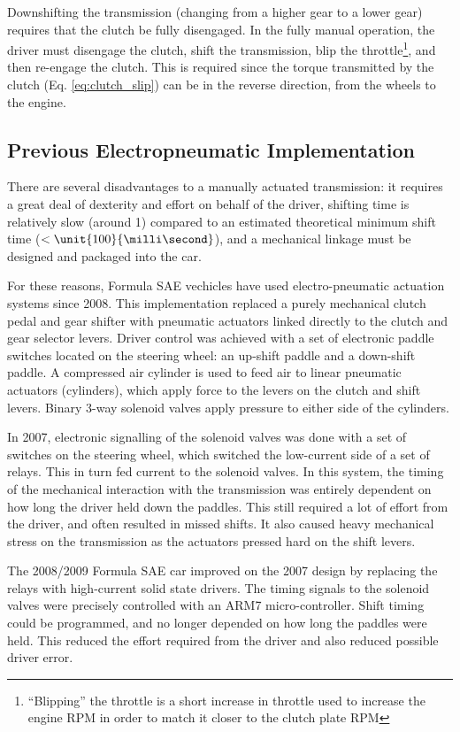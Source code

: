 Downshifting the transmission (changing from a higher gear to a lower gear) requires that the clutch be fully disengaged. In the fully manual operation, the driver must disengage the clutch, shift the transmission, blip the throttle\footnote{``Blipping'' the throttle is a short increase in throttle used to increase the engine RPM in order to match it closer to the clutch plate RPM}, and then re-engage the clutch. This is required since the torque transmitted by the clutch (Eq. \ref{eq:clutch_slip}) can be in the reverse direction, from the wheels to the engine.

\subsection{Previous Electropneumatic Implementation}

There are several disadvantages to a manually actuated transmission: it requires a great deal of dexterity and effort on behalf of the driver, shifting time is relatively slow (around \unit{1}{\second}) compared to an estimated theoretical minimum shift time ($<\unit{100}{\milli\second}$), and a mechanical linkage must be designed and packaged into the car.

For these reasons, Formula SAE vechicles have used electro-pneumatic actuation systems since 2008. This implementation replaced a purely mechanical clutch pedal and gear shifter with pneumatic actuators linked directly to the clutch and gear selector levers. Driver control was achieved with a set of electronic paddle switches located on the steering wheel: an up-shift paddle and a down-shift paddle. A compressed air cylinder is used to feed air to linear pneumatic actuators (cylinders), which apply force to the levers on the clutch and shift levers. Binary 3-way solenoid valves apply pressure to either side of the cylinders.

In 2007, electronic signalling of the solenoid valves was done with a set of switches on the steering wheel, which switched the low-current side of a set of relays. This in turn fed current to the solenoid valves. In this system, the timing of the mechanical interaction with the transmission was entirely dependent on how long the driver held down the paddles. This still required a lot of effort from the driver, and often resulted in missed shifts. It also caused heavy mechanical stress on the transmission as the actuators pressed hard on the shift levers.

The 2008/2009 Formula SAE car improved on the 2007 design by replacing the relays with high-current solid state drivers. The timing signals to the solenoid valves were precisely controlled with an ARM7 micro-controller. Shift timing could be programmed, and no longer depended on how long the paddles were held. This  reduced the effort required from the driver and also reduced possible driver error.

